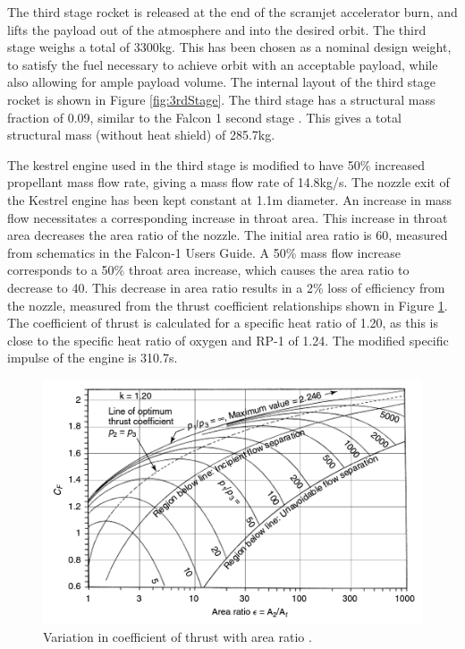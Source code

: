 	The third stage rocket is released at the end of the scramjet accelerator burn, and lifts the payload out of the atmosphere and into the desired orbit. The third stage weighs a total of 3300kg. This has been chosen as a nominal design weight, to satisfy the fuel necessary to achieve orbit with an acceptable payload, while also allowing for ample payload volume. The internal layout of the third stage rocket is shown in Figure \ref{fig:3rdStage}. The third stage has a structural mass fraction of 0.09, similar to the Falcon 1 second stage \cite{Vehicle2008}. This gives a total structural mass (without heat shield) of 285.7kg. 
	
	

	
The kestrel engine used in the third stage is modified to have 50\% increased propellant mass flow rate, giving a mass flow rate of 14.8kg/s. The nozzle exit of the Kestrel engine has been kept constant at 1.1m diameter. An increase in mass flow necessitates a corresponding increase in throat area. This increase in throat area decreases the area ratio of the nozzle. The initial area ratio is 60, measured from schematics in the Falcon-1 Users Guide. A 50\% mass flow increase corresponds to a 50\% throat area increase, which causes the area ratio to decrease to 40. This decrease in area ratio results in a 2\% loss of efficiency from the nozzle, measured from the thrust coefficient relationships shown in Figure \ref{fig:ThrustCoefficient-Arat}\cite{RPE}. The coefficient of thrust is calculated for a specific heat ratio of 1.20, as this is close to the specific heat ratio of oxygen and RP-1 of 1.24\cite{RPE}. The modified specific impulse of the engine is 310.7s.



	
	
	\begin{figure}[ht]
\centering
\includegraphics[width=0.7\linewidth]{"figures/3_vehicle_design/Thrust Coefficient - Arat"}
\caption{Variation in coefficient of thrust with area ratio \cite{RPE}.}
\label{fig:ThrustCoefficient-Arat}
\end{figure}




